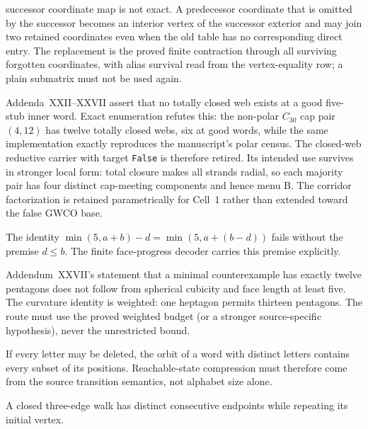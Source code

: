 \documentclass[11pt]{article}
\theoremstyle{definition}
\begin{document}
\begin{description}
        successor coordinate map is not exact.  A predecessor coordinate that
        is omitted by the successor becomes an interior vertex of the
        successor exterior and may join two retained coordinates even when the
        old table has no corresponding direct entry.  The replacement is the
        proved finite contraction through all surviving forgotten coordinates,
        with alias survival read from the vertex-equality row; a plain
        submatrix must not be used again.
  \item[The Good-Word Closed-web Obstruction.] Addenda~XXII--XXVII assert that
        no totally closed web exists at a good five-stub inner word.  Exact
        enumeration refutes this: the non-polar $C_{30}$ cap pair $(4,12)$
        has twelve totally closed webs, six at good words, while the same
        implementation exactly reproduces the manuscript's polar census.
        The closed-web reductive carrier with target \texttt{False} is
        therefore retired.  Its intended use survives in stronger local
        form: total closure makes all strands radial, so each majority pair
        has four distinct cap-meeting components and hence menu B.  The
        corridor factorization is retained parametrically for Cell~1 rather
        than extended toward the false GWCO base.
  \item[Unrestricted capped subtraction.] The identity
        $\min(5,a+b)-d=\min(5,a+(b-d))$ fails without the premise $d\leq b$.
        The finite face-progress decoder carries this premise explicitly.
  \item[The unweighted twelve-pentagon shortcut.] Addendum~XXVII's statement
        that a minimal counterexample has exactly twelve pentagons does not
        follow from spherical cubicity and face length at least five.  The
        curvature identity is weighted: one heptagon permits thirteen
        pentagons.  The route must use the proved weighted budget (or a stronger
        source-specific hypothesis), never the unrestricted bound.
  \item[Small deletion orbit from a small alphabet.] If every letter may be
        deleted, the orbit of a word with distinct letters contains every
        subset of its positions.  Reachable-state compression must therefore
        come from the source transition semantics, not alphabet size alone.
  \item[Local rail validity as global simplicity.] A closed three-edge walk
        has distinct consecutive endpoints while repeating its initial vertex.

\end{description}
\end{document}
